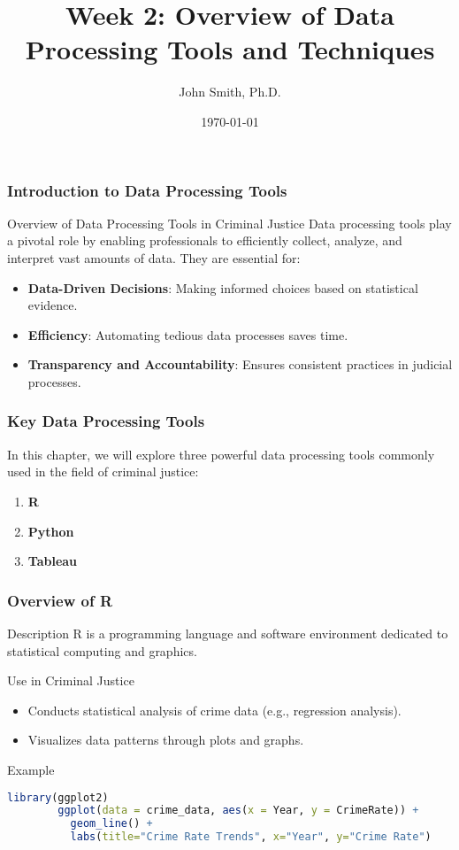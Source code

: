 \documentclass[aspectratio=169]{beamer}
\title[Overview of Data Processing Tools and Techniques]{Week 2: Overview of Data Processing Tools and Techniques}
\author[J. Smith]{John Smith, Ph.D.}
\institute[University Name]{
  Department of Computer Science\\
  University Name\\
  \vspace{0.3cm}
  Email: email@university.edu\\
  Website: www.university.edu
}
\date{\today}
\begin{document}
\frame{\titlepage}

\begin{frame}[fragile]
    \frametitle{Introduction to Data Processing Tools}
    \begin{block}{Overview of Data Processing Tools in Criminal Justice}
        Data processing tools play a pivotal role by enabling professionals to efficiently collect, analyze, and interpret vast amounts of data. They are essential for:
    \end{block}
    \begin{itemize}
        \item \textbf{Data-Driven Decisions}: Making informed choices based on statistical evidence.
        \item \textbf{Efficiency}: Automating tedious data processes saves time.
        \item \textbf{Transparency and Accountability}: Ensures consistent practices in judicial processes.
    \end{itemize}
\end{frame}

\begin{frame}[fragile]
    \frametitle{Key Data Processing Tools}
    In this chapter, we will explore three powerful data processing tools commonly used in the field of criminal justice:
    \begin{enumerate}
        \item \textbf{R}
        \item \textbf{Python}
        \item \textbf{Tableau}
    \end{enumerate}
\end{frame}

\begin{frame}[fragile]
    \frametitle{Overview of R}
    \begin{block}{Description}
        R is a programming language and software environment dedicated to statistical computing and graphics.
    \end{block}
    \begin{block}{Use in Criminal Justice}
        \begin{itemize}
            \item Conducts statistical analysis of crime data (e.g., regression analysis).
            \item Visualizes data patterns through plots and graphs.
        \end{itemize}
    \end{block}
    \begin{block}{Example}
        \begin{lstlisting}[language=R]
        library(ggplot2)
        ggplot(data = crime_data, aes(x = Year, y = CrimeRate)) +
          geom_line() + 
          labs(title="Crime Rate Trends", x="Year", y="Crime Rate")
        \end{lstlisting}
    \end{block}
\end{frame}
\end{document}
